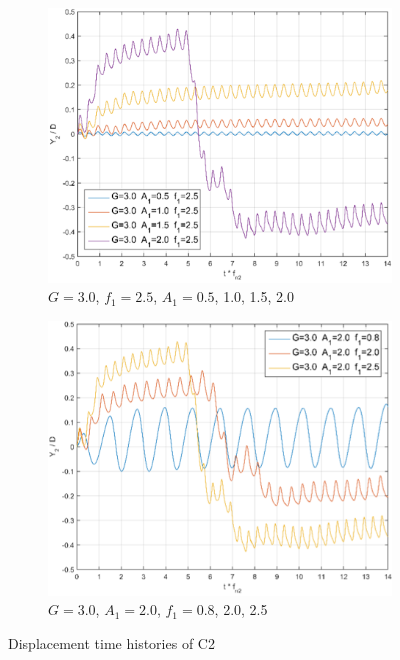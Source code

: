 \begin{figure}[tbh!]	
	\newcommand\widthp{0.5}
	\centering
	\captionsetup{justification=centering}
	\hspace*{\fill}%
	\begin{subfigure}[t]{\widthp\textwidth}
		\centering
		\includegraphics[width=\linewidth]{Figs/centreshift01}
		\caption{$G=3.0$, $f_1=2.5$, $A_1=0.5$, 1.0, 1.5, 2.0}
		\label{fig:centreshift01}
	\end{subfigure}%
	\begin{subfigure}[t]{\widthp\textwidth}
		\centering
		\includegraphics[width=\linewidth]{Figs/centreshift02}
		\caption{$G=3.0$, $A_1=2.0$, $f_1=0.8$, 2.0, 2.5}
		\label{fig:centreshift02}
	\end{subfigure}%
	\caption{
		Displacement time histories of C2
	}
	\label{fig:centreshift}
\end{figure}




